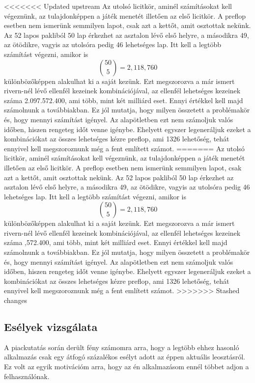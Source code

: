 <<<<<<< Updated upstream
Az utolsó licitkör, aminél számításokat kell végeznünk, az tulajdonképpen a játék menetét illetően az első licitkör. A preflop esetben nem ismerünk semmilyen lapot, csak azt a kettőt, amit osztottak nekünk. Az 52 lapos pakliból 50 lap érkezhet az asztalon lévő első helyre, a másodikra 49, az ötödikre, vagyis az utolsóra pedig 46 lehetséges lap. Itt kell a legtöbb számítást végezni, amikor is \[ \binom{50}{5}=2,118,760\] különbözőképpen alakulhat ki a saját kezünk. Ezt megszorozva a már ismert rivern-nél lévő ellenfél kezeinek kombinációjával, az ellenfél lehetséges kezeinek száma 2.097.572.400, ami több, mint két milliárd eset. Ennyi értékkel kell majd számolnunk a továbbiakban. Ez jól mutatja, hogy milyen összetett a problémakör és, hogy mennyi számítást igényel. Az alapötletben ezt nem számoljuk valós időben, hiszen rengeteg időt venne igénybe. Ehelyett egyszer legeneráljuk ezeket a kombinációkat az összes lehetséges kézre preflop, ami 1326 lehetőség, tehát ennyivel kell megszoroznunk még a fent említett számot.
=======
Az utolsó licitkör, aminél számításokat kell végeznünk, az tulajdonképpen a játék menetét illetően az első licitkör. A preflop esetben nem ismerünk semmilyen lapot, csak azt a kettőt, amit osztottak nekünk. Az 52 lapos pakliból 50 lap érkezhet az asztalon lévő első helyre, a másodikra 49, az ötödikre, vagyis az utolsóra pedig 46 lehetséges lap. Itt kell a legtöbb számítást végezni, amikor is \[ \binom{50}{5}=2,118,760\] %
különbözőképpen alakulhat ki a saját kezünk. Ezt megszorozva a már ismert rivern-nél lévő ellenfél kezeinek kombinációjával, az ellenfél lehetséges kezeinek száma ,572.400, ami több, mint két milliárd eset. Ennyi értékkel kell majd számolnunk a továbbiakban. Ez jól mutatja, hogy milyen összetett a problémakör és, hogy mennyi számítást igényel. Az alapötletben ezt nem számoljuk valós időben, hiszen rengeteg időt venne igénybe. Ehelyett egyszer legeneráljuk ezeket a kombinációkat az összes lehetséges kézre preflop, ami 1326 lehetőség, tehát ennyivel kell megszoroznunk még a fent említett számot.
>>>>>>> Stashed changes

\subsection{Esélyek vizsgálata}
A piackutatás során derült fény számomra arra, hogy a legtöbb ehhez hasonló alkalmazás csak egy átfogó százalékos esélyt adott az éppen aktuális leosztásról. Ez volt az egyik motivációm arra, hogy az én alkalmazásom ennél többet adjon a felhasználónak.

